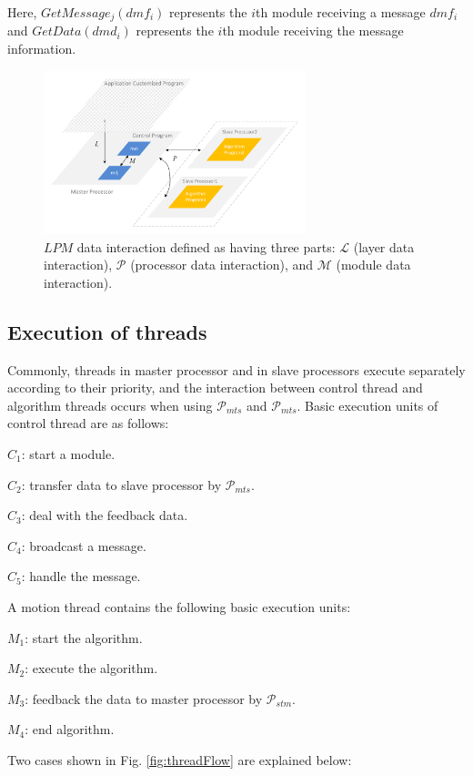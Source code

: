 \documentclass[journal,UTF8]{IEEEtran}
\begin{document}
	Here, $GetMessage_{j}(dmf_i)$ represents the $i$th module receiving a message $dmf_i$ and $GetData(dmd_i)$ represents the $i$th module receiving the message information.
	
	\begin{figure}
		\centering
		\includegraphics[width=3in]{fig/Interaction.pdf}
		\caption{ $LPM$ data interaction defined as having three parts: $\mathcal{L}$ (layer data interaction), $\mathcal{P}$ (processor data interaction), and $\mathcal{M}$ (module data interaction).}
		\label{fig:Interaction}
	\end{figure}
	
	\subsection{Execution of threads}
	Commonly, threads in master processor and in slave processors execute separately according to their priority, and the interaction between control thread and algorithm threads occurs when using $\mathcal{P}_{mts}$ and $\mathcal{P}_{mts}$. Basic execution units of control thread are as follows:
	
	\textbf{$C_{1}$}: start a module.
	
	\textbf{$C_{2}$}: transfer data to slave processor by $\mathcal{P}_{mts}$.
	
	\textbf{$C_{3}$}: deal with the feedback data.
	
	\textbf{$C_{4}$}: broadcast a message.
	
	\textbf{$C_{5}$}: handle the message.
	
	A motion thread contains the following basic execution units:
	
	\textbf{$M_{1}$}: start the algorithm.
	
	\textbf{$M_{2}$}: execute the algorithm.
	
	\textbf{$M_{3}$}: feedback the data to master processor by $\mathcal{P}_{stm}$.
	
	\textbf{$M_{4}$}: end algorithm.
	
	Two cases shown in Fig. \ref{fig:threadFlow} are explained below:
	
\end{document}
